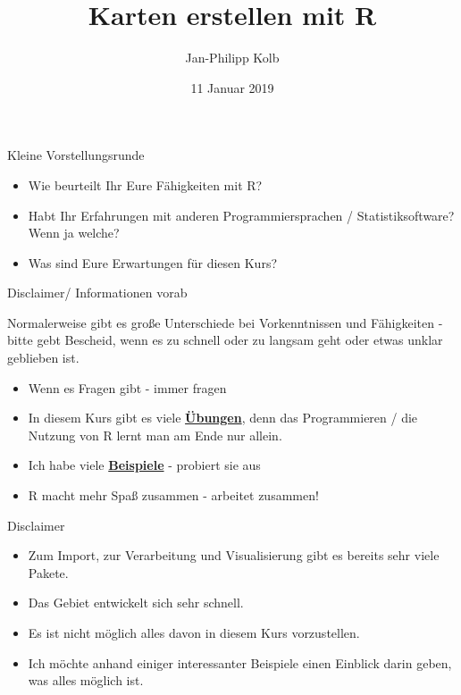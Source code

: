 \documentclass[ignorenonframetext,]{beamer}
\title{Karten erstellen mit R}
\author{Jan-Philipp Kolb}
\date{11 Januar 2019}
\providecommand{\tightlist}{%
  \setlength{\itemsep}{0pt}\setlength{\parskip}{0pt}}
\begin{document}
\frame{\titlepage}

\begin{frame}{Kleine Vorstellungsrunde}
\protect\hypertarget{kleine-vorstellungsrunde}{}

\begin{itemize}
\tightlist
\item
  Wie beurteilt Ihr Eure Fähigkeiten mit R?
\item
  Habt Ihr Erfahrungen mit anderen Programmiersprachen /
  Statistiksoftware? Wenn ja welche?
\item
  Was sind Eure Erwartungen für diesen Kurs?
\end{itemize}

\end{frame}

\begin{frame}{Disclaimer/ Informationen vorab}
\protect\hypertarget{disclaimer-informationen-vorab}{}

Normalerweise gibt es große Unterschiede bei Vorkenntnissen und
Fähigkeiten - bitte gebt Bescheid, wenn es zu schnell oder zu langsam
geht oder etwas unklar geblieben ist.

\begin{itemize}
\tightlist
\item
  Wenn es Fragen gibt - immer fragen
\item
  In diesem Kurs gibt es viele
  \href{http://web.math.ku.dk/~helle/R-intro/exercises.pdf}{\textbf{Übungen}},
  denn das Programmieren / die Nutzung von R lernt man am Ende nur
  allein.
\item
  Ich habe viele \href{https://www.showmeshiny.com/}{\textbf{Beispiele}}
  - probiert sie aus
\item
  R macht mehr Spaß zusammen - arbeitet zusammen!
\end{itemize}

\end{frame}

\begin{frame}{Disclaimer}
\protect\hypertarget{disclaimer}{}

\begin{itemize}
\tightlist
\item
  Zum Import, zur Verarbeitung und Visualisierung gibt es bereits sehr
  viele Pakete.
\item
  Das Gebiet entwickelt sich sehr schnell.
\item
  Es ist nicht möglich alles davon in diesem Kurs vorzustellen.
\item
  Ich möchte anhand einiger interessanter Beispiele einen Einblick darin
  geben, was alles möglich ist.
\end{itemize}

\end{frame}
\end{document}
